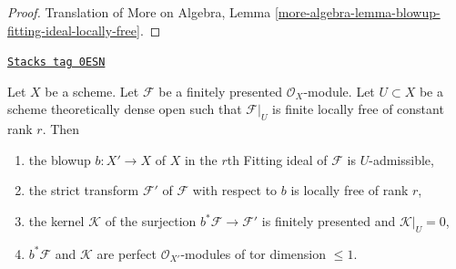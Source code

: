 \begin{proof}
Translation of More on Algebra, Lemma
\ref{more-algebra-lemma-blowup-fitting-ideal-locally-free}.
\end{proof}

\begin{lemma}
\label{divisors-lemma-blowup-fitting-ideal}
\href{https://stacks.math.columbia.edu/tag/0ESN}{\texttt{Stacks tag 0ESN}}

Let $X$ be a scheme. Let $\mathcal{F}$ be a finitely presented
$\mathcal{O}_X$-module. Let $U \subset X$ be a scheme theoretically
dense open such that $\mathcal{F}|_U$ is finite locally free of
constant rank $r$. Then
\begin{enumerate}
\item the blowup $b : X' \to X$ of $X$ in the $r$th Fitting
ideal of $\mathcal{F}$ is $U$-admissible,
\item the strict transform $\mathcal{F}'$ of $\mathcal{F}$
with respect to $b$ is locally free of rank $r$,
\item the kernel $\mathcal{K}$ of the surjection
$b^*\mathcal{F} \to \mathcal{F}'$ is
finitely presented and $\mathcal{K}|_U = 0$,
\item $b^*\mathcal{F}$ and $\mathcal{K}$ are perfect
$\mathcal{O}_{X'}$-modules of tor dimension $\leq 1$.
\end{enumerate}
\end{lemma}

